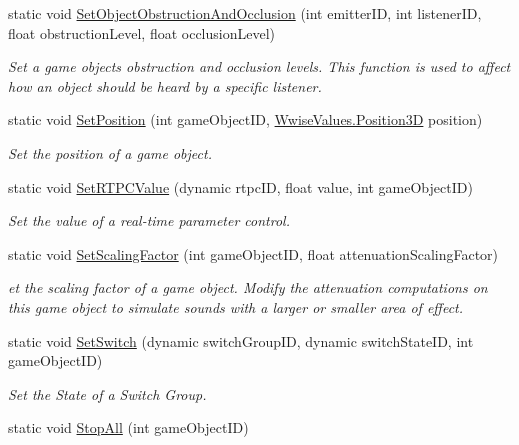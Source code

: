 \begin{DoxyCompactItemize}
static void \mbox{\hyperlink{classak_1_1soundengine_a0cbbaf6a6d2ef4eb93c75dc334f9bbba}{Set\+Object\+Obstruction\+And\+Occlusion}} (int emitter\+ID, int listener\+ID, float obstruction\+Level, float occlusion\+Level)
\begin{DoxyCompactList}\small\item\em Set a game object\textquotesingle{}s obstruction and occlusion levels. This function is used to affect how an object should be heard by a specific listener. \end{DoxyCompactList}\item 
static void \mbox{\hyperlink{classak_1_1soundengine_a03eaed1fc3797d3b12e0a1f99b36b117}{Set\+Position}} (int game\+Object\+ID, \mbox{\hyperlink{class_waapi_c_s_1_1_custom_values_1_1_wwise_values_1_1_position3_d}{Wwise\+Values.\+Position3D}} position)
\begin{DoxyCompactList}\small\item\em Set the position of a game object. \end{DoxyCompactList}\item 
static void \mbox{\hyperlink{classak_1_1soundengine_a00e8ea0a613f12b5aac1f86d34980cdc}{Set\+R\+T\+P\+C\+Value}} (dynamic rtpc\+ID, float value, int game\+Object\+ID)
\begin{DoxyCompactList}\small\item\em Set the value of a real-\/time parameter control. \end{DoxyCompactList}\item 
static void \mbox{\hyperlink{classak_1_1soundengine_aee8799d8967ab5c7b37ba2c430a9c891}{Set\+Scaling\+Factor}} (int game\+Object\+ID, float attenuation\+Scaling\+Factor)
\begin{DoxyCompactList}\small\item\em et the scaling factor of a game object. Modify the attenuation computations on this game object to simulate sounds with a larger or smaller area of effect. \end{DoxyCompactList}\item 
static void \mbox{\hyperlink{classak_1_1soundengine_aff3bd19c1134a0ce06ef3823dbc88f86}{Set\+Switch}} (dynamic switch\+Group\+ID, dynamic switch\+State\+ID, int game\+Object\+ID)
\begin{DoxyCompactList}\small\item\em Set the State of a Switch Group. \end{DoxyCompactList}\item 
static void \mbox{\hyperlink{classak_1_1soundengine_ac749b4e54cee0cc5aae534f13ed4e2b5}{Stop\+All}} (int game\+Object\+ID)

\end{DoxyCompactItemize}
